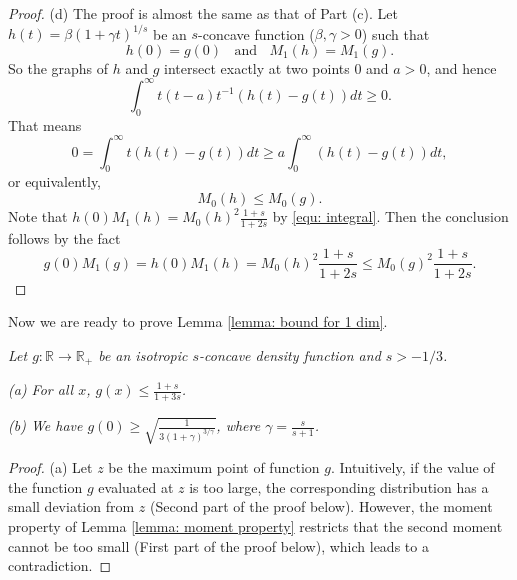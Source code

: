 \documentclass[11pt]{article}
\begin{document}
{{{{\begin{proof}
(d) The proof is almost the same as that of Part (c). Let $h(t)=\beta(1+\gamma t)^{1/s}$ be an $s$-concave function ($\beta,\gamma>0$) such that
\begin{equation*}
h(0)=g(0)\ \ \ \ \mbox{and}\ \ \ \ M_1(h)=M_1(g).
\end{equation*}
So the graphs of $h$ and $g$ intersect exactly at two points $0$ and $a>0$, and hence
\begin{equation*}
\int_0^{\infty}t(t-a)t^{-1}(h(t)-g(t))dt\ge 0.
\end{equation*}
That means
\begin{equation*}
0=\int_0^{\infty}t(h(t)-g(t))dt\ge a\int_0^{\infty}(h(t)-g(t))dt,
\end{equation*}
or equivalently,
\begin{equation*}
M_0(h)\le M_0(g).
\end{equation*}
Note that $h(0)M_1(h)=M_0(h)^2\frac{1+s}{1+2s}$ by \eqref{equ: integral}.
Then the conclusion follows by the fact
\begin{equation*}
g(0)M_1(g)=h(0)M_1(h)=M_0(h)^2\frac{1+s}{1+2s}\le M_0(g)^2\frac{1+s}{1+2s}.
\end{equation*}
\end{proof}

Now we are ready to prove Lemma \ref{lemma: bound for 1 dim}.

\medskip
{}
\emph{Let $g:\mathbb{R}\rightarrow\mathbb{R}_+$ be an isotropic $s$-concave density function and $s> -1/3$.}

\emph{
(a) For all $x$, $g(x)\le \frac{1+s}{1+3s}$.}

\emph{
(b) We have $g(0)\ge\sqrt{\frac{1}{3(1+\gamma)^{3/\gamma}}}$, where $\gamma=\frac{s}{s+1}$.}
\medskip
\begin{proof}
(a) Let $z$ be the maximum point of function $g$. Intuitively, if the value of the function $g$ evaluated at $z$ is too large, the corresponding distribution has a small deviation from $z$ (Second part of the proof below). However, the moment property of Lemma \ref{lemma: moment property} restricts that the second moment cannot be too small (First part of the proof below), which leads to a contradiction.


\end{proof}}}}}
\end{document}
